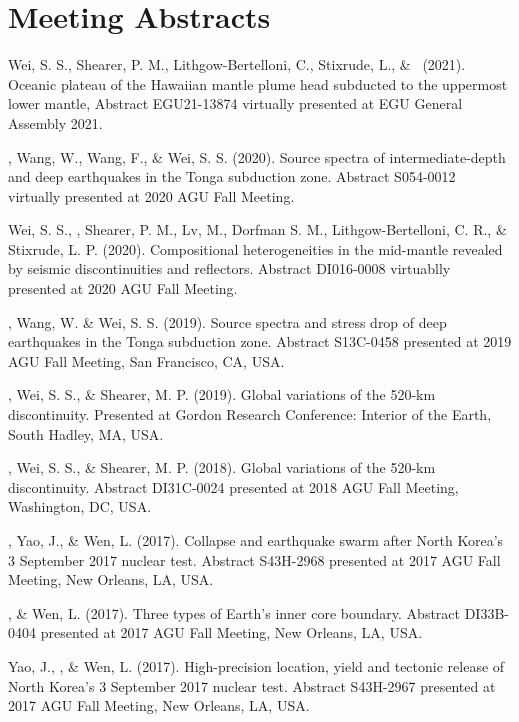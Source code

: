 \section*{Meeting Abstracts}

\begin{etaremune}
\item Wei, S. S., Shearer, P. M., Lithgow-Bertelloni, C., Stixrude, L., \& \Tian\ (2021).
	Oceanic plateau of the Hawaiian mantle plume head subducted to the uppermost lower mantle,
	Abstract EGU21-13874 virtually presented at EGU General Assembly 2021.
\item \Tian, Wang, W., Wang, F., \& Wei, S. S. (2020).
	Source spectra of intermediate-depth and deep earthquakes in the Tonga subduction zone.
	Abstract S054-0012 virtually presented at 2020 AGU Fall Meeting.
\item Wei, S. S., \Tian, Shearer, P. M., Lv, M., Dorfman S. M., Lithgow-Bertelloni, C. R., \& Stixrude, L. P. (2020).
	Compositional heterogeneities in the mid-mantle revealed by seismic discontinuities and reflectors.
	Abstract DI016-0008 virtuablly presented at 2020 AGU Fall Meeting.
\item \Tian, Wang, W. \& Wei, S. S. (2019).
	Source spectra and stress drop of deep earthquakes in the Tonga subduction zone.
	Abstract S13C-0458 presented at 2019 AGU Fall Meeting, San Francisco, CA, USA.
\item
    \Tian, Wei, S. S., \& Shearer, M. P. (2019).
    Global variations of the 520-km discontinuity.
    Presented at Gordon Research Conference: Interior of the Earth, South Hadley, MA, USA.
\item
    \Tian, Wei, S. S., \& Shearer, M. P. (2018).
    Global variations of the 520-km discontinuity.
    Abstract DI31C-0024 presented at 2018 AGU Fall Meeting, Washington, DC, USA.
\item
    \Tian, Yao, J., \& Wen, L. (2017).
    Collapse and earthquake swarm after North Korea's 3 September 2017 nuclear test.
    Abstract S43H-2968 presented at 2017 AGU Fall Meeting, New Orleans, LA, USA.
\item
    \Tian, \& Wen, L. (2017).
    Three types of Earth's inner core boundary.
    Abstract DI33B-0404 presented at 2017 AGU Fall Meeting, New Orleans, LA, USA.
\item
    Yao, J., \Tian, \& Wen, L. (2017).
    High-precision location, yield and tectonic release of North Korea's 3 September 2017 nuclear test.
    Abstract S43H-2967 presented at 2017 AGU Fall Meeting, New Orleans, LA, USA.
\item

\end{etaremune}
